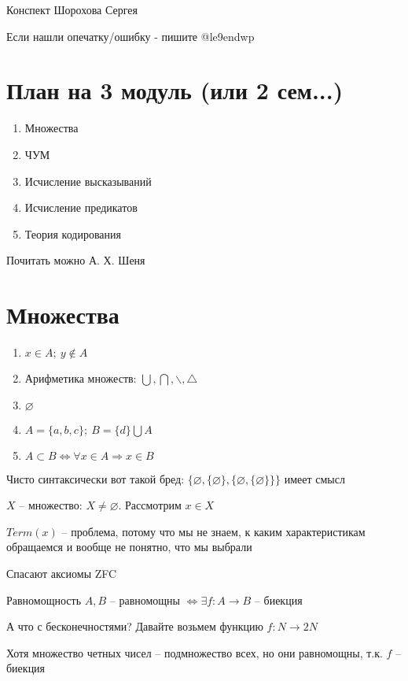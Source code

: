 \documentclass[12pt]{article}
\begin{document}
\tableofcontents
\newpage

\begin{flushright}
    Конспект Шорохова Сергея

    Если нашли опечатку/ошибку - пишите @le9endwp
\end{flushright}

\section{План на 3 модуль (или 2 сем...)}

\begin{enumerate}
    \item Множества
    \item ЧУМ
    \item Исчисление высказываний
    \item Исчисление предикатов
    \item Теория кодирования
\end{enumerate}

Почитать можно А. Х. Шеня

\section{Множества}

\begin{enumerate}
    \item $x \in A;\ y \not \in A$
    \item Арифметика множеств: $\bigcup, \bigcap, \backslash, \triangle$
    \item $\varnothing$
    \item $A = \{ a, b, c \};\ B = \{d\} \bigcup A$
    \item $A \subset B \Leftrightarrow \forall x \in A \Rightarrow x \in B$
\end{enumerate}

\begin{Remark}{}
    Чисто синтаксически вот такой бред: $\{ \varnothing, \{ \varnothing \}, \{ \varnothing, \{ \varnothing \} \} \}$ имеет смысл
\end{Remark}

$X$ -- множество: $X \neq \varnothing$. Рассмотрим $x \in X$

$Term(x)$ -- проблема, потому что мы не знаем, к каким характеристикам обращаемся и вообще не понятно, что мы выбрали

Спасают аксиомы ZFC

\begin{defin}{Равномощность}
    $A, B$ -- равномощны $\Leftrightarrow \exists f : A \rightarrow B$ -- биекция

    А что с бесконечностями? Давайте возьмем функцию $f : N \rightarrow 2N$

    Хотя множество четных чисел -- подмножество всех, но они равномощны, т.к. $f$ -- биекция
\end{defin}
\end{document}
